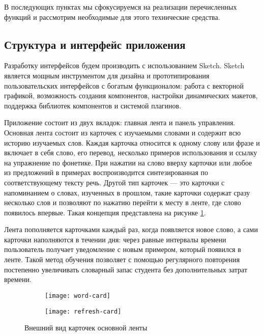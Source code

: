В последующих пунктах мы сфокусируемся на реализации перечисленных функций и рассмотрим необходимые для этого технические средства.

\subsection{Структура и интерфейс приложения}
Разработку интерфейсов будем производить с использованием Sketch. Sketch является мощным инструментом для дизайна и прототипирования пользовательских интерфейсов с богатым функционалом: работа с векторной графикой, возможность создания компонентов, настройки динамических макетов, поддержка библиотек компонентов и системой плагинов.

Приложение состоит из двух вкладок: главная лента и панель управления. Основная лента состоит из карточек с изучаемыми словами и содержит всю историю изучаемых слов. Каждая карточка относится к одному слову или фразе и включает в себя слово, его перевод, несколько примеров использования и ссылку на упражнение по фонетике. При нажатии на слово вверху карточки или любое из предложений в примерах воспроизводится синтезированная по соответствующему тексту речь. Другой тип карточек --- это карточки с напоминанием о словах, изученных в прошлом, такие карточки содержат сразу несколько слов и позволяют по нажатию перейти к месту в ленте, где слово появилось впервые. Такая концепция представлена на рисунке \ref{fig:word-cards}.

Лента пополняется карточками каждый раз, когда появляется новое слово, а сами карточки наполняются в течении дня: через равные интервалы времени пользователь получает уведомление с новым примером, который появился в ленте. Такой метод обучения позволяет с помощью регулярного повторения постепенно увеличивать словарный запас студента без дополнительных затрат времени.

\begin{figure}[h]
	\centering
	\begin{subfigure}{0.3\textwidth}
		\centering
		\texttt{[image: word-card]}
	\end{subfigure}
	\hspace{0.2\textwidth}
	\begin{subfigure}{0.3\textwidth}
		\centering
		\texttt{[image: refresh-card]}
	\end{subfigure}
	\caption{Внешний вид карточек основной ленты}
	\label{fig:word-cards}
\end{figure}

